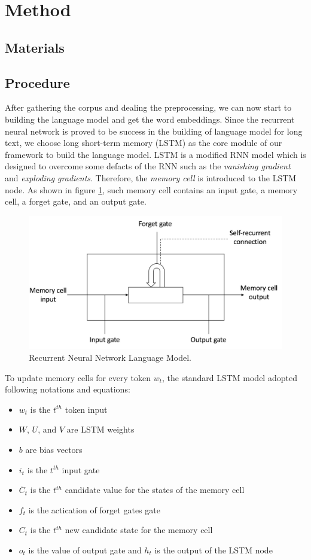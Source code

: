 \documentclass{article}
\begin{document}
\section{Method}
\subsection{Materials}

\subsection{Procedure}
After gathering the corpus and dealing the preprocessing, we can now start to building the language model and get the word embeddings. Since the recurrent neural network is proved to be success in the building of language model for long text\cite{mikolov2011rnnlm}, we choose long short-term memory (LSTM) as the core module of our framework to build the language model. LSTM is a modified RNN model which is designed to overcome some defacts of the RNN such as the \textit{vanishing gradient} and \textit{exploding gradients}. Therefore, the \textit{memory cell} is introduced to the LSTM node. As shown in figure \ref{fig:lstmnode}, such memory cell contains an input gate, a memory cell, a forget gate, and an output gate.
\begin{figure}[htb]
\centering
\includegraphics[scale=0.2]{LSTMNODE.png}
\caption{Recurrent Neural Network Language Model.}
\label{fig:lstmnode}
\end{figure}

To update memory cells for every token $w_{t}$, the standard LSTM model adopted following notations and equations:
\begin{itemize}
  \item $w_{t}$ is the $t^{th}$ token input
  \item $W$, $U$, and $V$ are LSTM weights
  \item $b$ are bias vectors
  \item $i_{t}$ is the $t^{th}$ input gate
  \item $\overline {C}_{t}$ is the $t^{th}$ candidate value for the states of the memory cell
  \item $f_{t}$ is the actication of forget gates gate
  \item $C_{t}$ is the $t^{th}$ new candidate state for the memory cell
  \item $o_{t}$ is the value of output gate and $h_{t}$ is the output of the LSTM node
\end{itemize}
\end{document}

